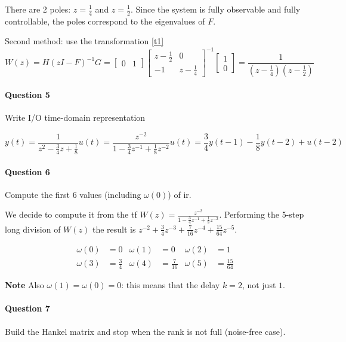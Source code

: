 \begin{exa}
    There are 2 poles: $z=\frac{1}{4}$ and $z=\frac{1}{2}$. Since the system is fully observable and fully controllable, the poles correspond to the eigenvalues of $F$.

    Second method: use the transformation \ref{t1}
    \[
        W(z) = H(zI-F)^{-1}G = \begin{bmatrix}
            0 & 1
        \end{bmatrix} \begin{bmatrix}
            z-\frac{1}{2} & 0 \\
            -1 & z-\frac{1}{4}
        \end{bmatrix}^{-1} \begin{bmatrix}
            1 \\ 0
        \end{bmatrix} = \frac{1}{(z-\frac{1}{4})(z-\frac{1}{2})}
    \]

    \paragraph{Question 5} Write I/O time-domain representation

    \[
        y(t) = \frac{1}{z^2-\frac{3}{4}z+\frac{1}{8}}u(t) = \frac{z^{-2}}{1-\frac{3}{4}z^{-1}+\frac{1}{8}z^{-2}}u(t) = \frac{3}{4}y(t-1) - \frac{1}{8}y(t-2) + u(t-2)
    \]

    \paragraph{Question 6} Compute the first 6 values (including $\omega(0)$) of \gls{ir}.

    We decide to compute it from the \gls{tf} $W(z) = \frac{z^{-2}}{1-\frac{3}{4}z^{-1}+\frac{1}{8}z^{-2}}$.
    Performing the 5-step long division of $W(z)$ the result is $z^{-2}+\frac{3}{4}z^{-3}+\frac{7}{16}z^{-4}+\frac{15}{64}z^{-5}$.

    \begin{align*}
        \omega(0) &= 0 &
        \omega(1) &= 0 &
        \omega(2) &= 1 \\
        \omega(3) &= \frac{3}{4} &
        \omega(4) &= \frac{7}{16} &
        \omega(5) &= \frac{15}{64}
    \end{align*}

    \textbf{Note} Also $\omega(1)=\omega(0)=0$: this means that the delay $k=2$, not just $1$.
    
    \paragraph{Question 7} Build the Hankel matrix and stop when the rank is not full (noise-free case).


\end{exa}
